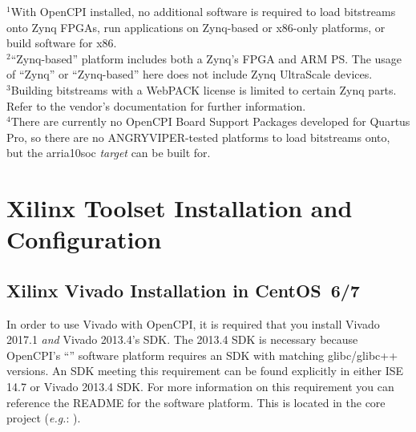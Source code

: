 \begin{flushleft}
\begin{landscape}
\begin{center}
\begin{table}[H]
		\footnotesize{$^1$With OpenCPI installed, no additional software is required to load bitstreams onto Zynq FPGAs, run applications on Zynq-based or x86-only platforms, or build software for x86.}\\
		\footnotesize{$^2$``Zynq-based'' platform includes both a Zynq's FPGA and ARM PS. The usage of ``Zynq'' or ``Zynq-based'' here does not include Zynq UltraScale devices.}\\
		\footnotesize{$^3$Building bitstreams with a WebPACK license is limited to certain Zynq parts. Refer to the vendor's documentation for further information.}\\
		\footnotesize{$^4$There are currently no OpenCPI Board Support Packages developed for Quartus Pro, so there are no ANGRYVIPER-tested platforms to load bitstreams onto, but the arria10soc \textit{target} can be built for.}\\
	\end{table}
\end{center}
\end{landscape}

\section{Xilinx Toolset Installation and Configuration}
\subsection{Xilinx Vivado Installation in CentOS~6/7}
\label{sec:viv_intro}
\begin{flushleft}
In order to use Vivado with OpenCPI, it is required that you install Vivado 2017.1 \textit{and} Vivado 2013.4's SDK. The 2013.4 SDK is necessary because OpenCPI's ``'' software platform requires an SDK with matching glibc/glibc++ versions. An SDK meeting this requirement can be found explicitly in either ISE 14.7 or Vivado 2013.4 SDK. For more information on this requirement you can reference the README for the  software platform. This is located in the core project (\textit{e.g.}: ).

\end{flushleft}
\end{flushleft}
